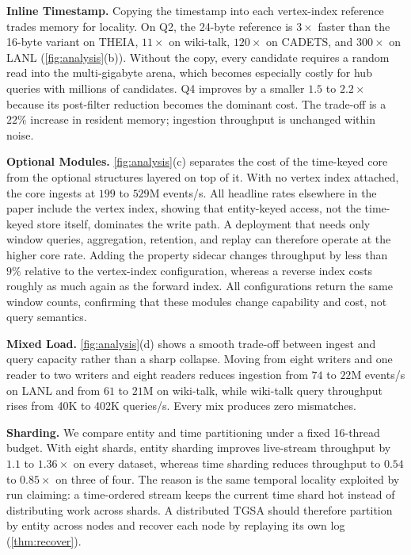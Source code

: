 \documentclass[sigconf,nonacm]{acmart}
\newcommand{\sys}{TGSA\xspace}
\begin{document}
\textbf{Inline Timestamp.} Copying the timestamp into each vertex-index
reference trades memory for locality. On Q2, the 24-byte reference is
$3\times$ faster than the 16-byte variant on THEIA, $11\times$ on
wiki-talk, $120\times$ on CADETS, and $300\times$ on LANL
(\cref{fig:analysis}(b)). Without the copy, every candidate requires a
random read into the multi-gigabyte arena, which becomes especially
costly for hub queries with millions of candidates. Q4 improves by a
smaller $1.5$ to $2.2\times$ because its post-filter reduction becomes
the dominant cost. The trade-off is a $22\%$ increase in resident
memory; ingestion throughput is unchanged within noise.

\textbf{Optional Modules.} \cref{fig:analysis}(c) separates the cost of
the time-keyed core from the optional structures layered on top of it.
With no vertex index attached, the core ingests at $199$ to $529$M
events/s. All headline rates elsewhere in the paper include the vertex
index, showing that entity-keyed access, not the time-keyed store
itself, dominates the write path. A deployment that needs only window
queries, aggregation, retention, and replay can therefore operate at
the higher core rate. Adding the property sidecar changes throughput by
less than $9\%$ relative to the vertex-index configuration, whereas a
reverse index costs roughly as much again as the forward index. All
configurations return the same window counts, confirming that these
modules change capability and cost, not query semantics.

\textbf{Mixed Load.} \cref{fig:analysis}(d) shows a smooth trade-off
between ingest and query capacity rather than a sharp collapse. Moving
from eight writers and one reader to two writers and eight readers
reduces ingestion from $74$ to $22$M events/s on LANL and from $61$ to
$21$M on wiki-talk, while wiki-talk query throughput rises from 40K to
402K queries/s. Every mix produces zero mismatches.

\textbf{Sharding.} We compare entity and time partitioning under a
fixed 16-thread budget. With eight shards, entity sharding improves
live-stream throughput by $1.1$ to $1.36\times$ on every dataset,
whereas time sharding reduces throughput to $0.54$ to $0.85\times$ on
three of four. The reason is the same temporal locality exploited by
run claiming: a time-ordered stream keeps the current time shard hot
instead of distributing work across shards. A distributed \sys should
therefore partition by entity across nodes and recover each node by
replaying its own log (\cref{thm:recover}).
\end{document}
